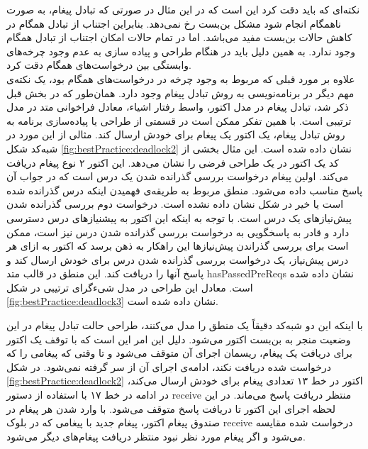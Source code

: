 \begin{enumerate}
نکته‌ای که باید دقت کرد این است که در این مثال در صورتی که تبادل پیغام، به صورت ناهمگام انجام شود مشکل بن‌بست رخ نمی‌دهد. بنابراین اجتناب از تبادل همگام در کاهش حالات بن‌بست مفید می‌باشد. اما در تمام حالات امکان اجتناب از تبادل همگام وجود ندارد. به همین دلیل باید در هنگام طراحی و پیاده سازی به عدم وجود چرخه‌های وابستگی بین درخواست‌های همگام دقت کرد. \\
علاوه بر مورد قبلی که مربوط به وجود چرخه در درخواست‌های همگام بود، یک نکته‌ی مهم دیگر در برنامه‌نویسی به روش تبادل پیغام وجود دارد. همان‌طور که در بخش قبل ذکر شد، تبادل پیغام در مدل اکتور، واسط رفتار اشیاء، معادل فراخوانی متد در مدل ترتیبی است. با همین تفکر ممکن است در قسمتی از طراحی یا پیاده‌سازی برنامه به روش تبادل پیغام، یک اکتور یک پیغام برای خودش ارسال کند. مثالی از این مورد در شبه‌کد شکل \ref{fig:bestPractice:deadlock2} نشان داده شده است.
این مثال بخشی از کد یک اکتور در یک طراحی فرضی را نشان می‌دهد. این اکتور ۲ نوع پیغام دریافت می‌کند. اولین پیغام درخواست بررسی گذرانده شدن یک درس است که در جواب آن پاسخ مناسب داده می‌شود. منطق مربوط به طریقه‌ی فهمیدن اینکه درس گذرانده شده است یا خیر در شکل نشان داده نشده است. درخواست دوم بررسی گذرانده شدن پیش‌نیازهای یک درس است. با توجه به اینکه این اکتور به پیشنیازهای درس دسترسی دارد و قادر به پاسخگویی به درخواست بررسی گذرانده شدن درس نیز است، ممکن است برای بررسی گذراندن پیش‌نیازها این راهکار به ذهن برسد که اکتور به ازای هر درس پیش‌نیاز، یک درخواست بررسی گذرانده شدن درس برای خودش ارسال کند و پاسخ آنها را دریافت کند. این منطق در قالب متد hasPassedPreReqs نشان داده شده است. معادل این طراحی در مدل شیءگرای ترتیبی در شکل \ref{fig:bestPractice:deadlock3} نشان داده شده است.
\end{enumerate}
با اینکه این دو شبه‌کد دقیقاً یک منطق را مدل می‌کنند، طراحی حالت تبادل پیغام در این وضعیت منجر به بن‌بست اکتور می‌شود. دلیل این امر این است که با توقف یک اکتور برای دریافت یک پیغام، ریسمان اجرای آن متوقف می‌شود و تا وقتی که پیغامی را که درخواست شده دریافت نکند، ادامه‌ی اجرای آن از سر گرفته نمی‌شود. در شکل \ref{fig:bestPractice:deadlock2} اکتور در خط ۱۳ تعدادی پیغام برای خودش ارسال می‌کند، در ادامه در خط ۱۷ با استفاده از دستور receive منتظر دریافت پاسخ می‌ماند. در این لحظه اجرای این اکتور تا دریافت پاسخ متوقف می‌شود. با وارد شدن هر پیغام در صندوق پیغام اکتور، پیغام جدید با پیغامی که در بلوک receive درخواست شده مقایسه می‌شود و اگر پیغام مورد نظر نبود منتظر دریافت پیغام‌های دیگر می‌شود.
